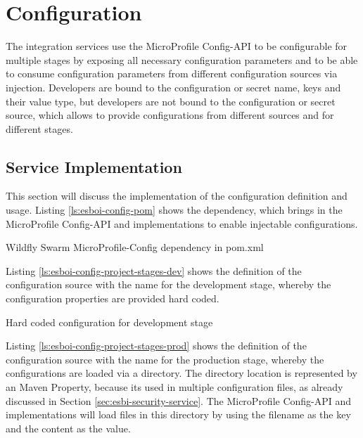 \section{Configuration}
\label{sec:esbi-configuration}
The integration services use the MicroProfile Config-API to be configurable for multiple stages by exposing all necessary configuration parameters and to be able to consume configuration parameters from different configuration sources via injection. Developers are bound to the configuration or secret name, keys and their value type, but developers are not bound to the configuration or secret source, which allows to provide configurations from different sources and for different stages. 

\subsection{Service Implementation}
\label{sec:esbi-config-service}
This section will discuss the implementation of the configuration definition and usage. Listing \vref{ls:esboi-config-pom} shows the dependency, which brings in the MicroProfile Config-API and implementations to enable injectable configurations.
 
\begin{listing}
	\caption{Wildfly Swarm MicroProfile-Config dependency in pom.xml}
	\label{ls:esboi-config-pom}
\end{listing}

Listing \vref{ls:esboi-config-project-stages-dev} shows the definition of the configuration source with the name  for the development stage, whereby the configuration properties are provided hard coded.

\begin{listing}
	\caption{Hard coded configuration for development stage}
	\label{ls:esboi-config-project-stages-dev}
\end{listing}

Listing \vref{ls:esboi-config-project-stages-prod} shows the definition of the configuration source with the name  for the production stage, whereby the configurations are loaded via a directory. The directory location is represented by an Maven Property, because its used in multiple configuration files, as already discussed in Section \vref{sec:esbi-security-service}. The MicroProfile Config-API and implementations will load files in this directory by using the filename as the key and the content as the value.

